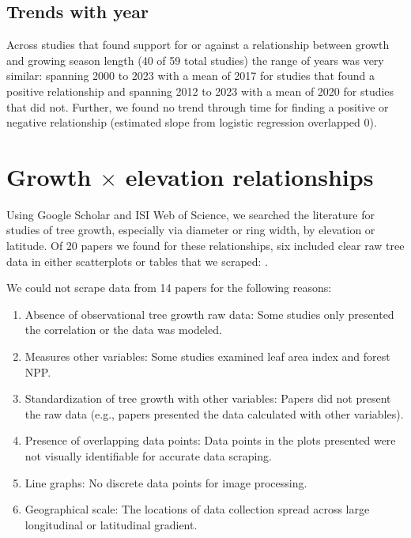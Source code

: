 \documentclass[11pt]{article}
\begin{document}
\subsection*{Trends with year}
Across studies that found support for or against a relationship between growth and growing season length (40 of 59 total studies) the range of years was very similar: spanning 2000 to 2023 with a mean of 2017 for studies that found a positive relationship and spanning 2012 to 2023 with a mean of 2020 for studies that did not. Further, we found no trend through time for finding a positive or negative relationship  (estimated slope from logistic regression overlapped 0). 

\section*{Growth $\times$ elevation relationships}

Using Google Scholar and ISI Web of Science, we searched the literature for studies of tree growth, especially via diameter or ring width, by elevation or latitude. Of 20 papers we found for these relationships, six included clear raw tree data in either scatterplots or tables that we scraped: \cite{oleksyn1998growth,huang2010radial,cavin2017highest,wang2017climatic,zhu2018spatial,zhou2022altitudinal}. 

We could not scrape data from 14 papers for the following reasons: 
\begin{enumerate}
\item Absence of observational tree growth raw data: Some studies only presented the correlation or the data was modeled. 
\item  Measures other variables: Some studies examined leaf area index and forest NPP. 
\item  Standardization of tree growth with other variables: Papers did not present the raw data (e.g., papers presented the data calculated with other variables).
\item  Presence of overlapping data points: Data points in the plots presented were not visually identifiable for accurate data scraping.
\item Line graphs: No discrete data points for image processing. 
\item Geographical scale: The locations of data collection spread across large longitudinal or latitudinal gradient. 
\end{enumerate}
\end{document}
